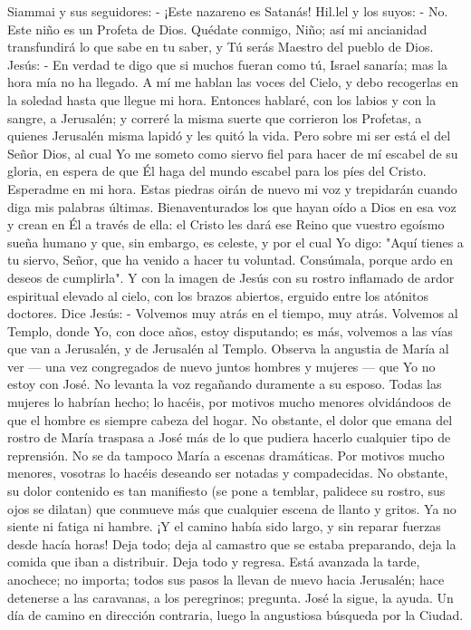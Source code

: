 \documentclass[12pt]{book} %
\begin{document}
Siammai y sus seguidores: - ¡Este nazareno es Satanás! 
Hil.lel y los suyos: - No. Este niño es un Profeta de Dios. Quédate conmigo, Niño; así mi ancianidad transfundirá lo que 
sabe en tu saber, y Tú serás Maestro del pueblo de Dios. 
Jesús: - En verdad te digo que si muchos fueran como tú, Israel sanaría; mas la hora mía no ha llegado. A mí me hablan 
las voces del Cielo, y debo recogerlas en la soledad hasta que llegue mi hora. Entonces hablaré, con los labios y con la sangre, a Jerusalén; y correré la misma suerte que corrieron los Profetas, a quienes Jerusalén misma lapidó y les quitó la vida. Pero sobre mi ser está el del Señor Dios, al cual Yo me someto como siervo fiel para hacer de mí escabel de su gloria, en espera de que Él haga del mundo escabel para los píes del Cristo. Esperadme en mi hora. Estas piedras oirán de nuevo mi voz y trepidarán cuando diga mis palabras últimas. Bienaventurados los que hayan oído a Dios en esa voz y crean en Él a través de ella: el Cristo les dará ese Reino que vuestro egoísmo sueña humano y que, sin embargo, es celeste, y por el cual Yo digo: "Aquí tienes a tu siervo, Señor, que ha venido a hacer tu voluntad. Consúmala, porque ardo en deseos de cumplirla". 
Y con la imagen de Jesús con su rostro inflamado de ardor espiritual elevado al cielo, con los brazos abiertos, erguido 
entre los atónitos doctores.  
Dice Jesús:                         
- Volvemos muy atrás en el tiempo, muy atrás. Volvemos al Templo, donde Yo, con doce años, estoy disputando; es 
más, volvemos a las vías que van a Jerusalén, y de Jerusalén al Templo. 
Observa la angustia de María al ver — una vez congregados de nuevo juntos hombres y mujeres — que Yo no estoy con José. 
No levanta la voz regañando duramente a su esposo. Todas las mujeres lo habrían hecho; lo hacéis, por motivos mucho menores olvidándoos de que el hombre es siempre cabeza del hogar. No obstante, el dolor que emana del rostro de María traspasa a José más de lo que pudiera hacerlo cualquier tipo de reprensión. No se da tampoco María a escenas dramáticas. Por motivos mucho menores, vosotras lo hacéis deseando ser notadas y compadecidas. No obstante, su dolor contenido es tan manifiesto (se pone a temblar, palidece su rostro, sus ojos se dilatan) que conmueve más que cualquier escena de llanto y gritos. 
Ya no siente ni fatiga ni hambre. ¡Y el camino había sido largo, y sin reparar fuerzas desde hacía horas! Deja todo; deja al camastro que se estaba preparando, deja la comida que iban a distribuir. Deja todo y regresa. Está avanzada la tarde, anochece; no importa; todos sus pasos la llevan de nuevo hacia Jerusalén; hace detenerse a las caravanas, a los peregrinos; pregunta. José la sigue, la ayuda. Un día de camino en dirección contraria, luego la angustiosa búsqueda por la Ciudad. 
\end{document}
